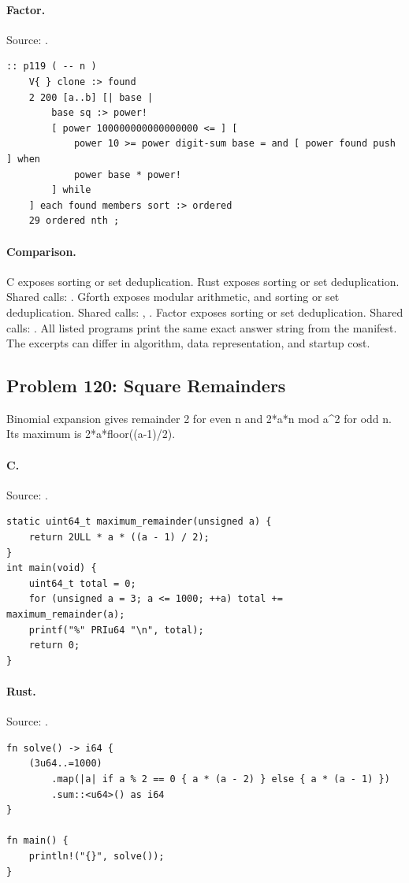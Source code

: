 \paragraph{Factor.} Source: .
\begin{lstlisting}
:: p119 ( -- n )
    V{ } clone :> found
    2 200 [a..b] [| base |
        base sq :> power!
        [ power 100000000000000000 <= ] [
            power 10 >= power digit-sum base = and [ power found push ] when
            power base * power!
        ] while
    ] each found members sort :> ordered
    29 ordered nth ;
\end{lstlisting}

\paragraph{Comparison.}
C exposes sorting or set deduplication. Rust exposes sorting or set deduplication. Shared calls: \texttt{}. Gforth exposes modular arithmetic, and sorting or set deduplication. Shared calls: \texttt{}, \texttt{}. Factor exposes sorting or set deduplication. Shared calls: \texttt{}.
All listed programs print the same exact answer string from the manifest. The excerpts can differ in algorithm, data representation, and startup cost.

\subsection{Problem 120: Square Remainders}
\label{walkthrough:p120}
Binomial expansion gives remainder 2 for even n and 2*a*n mod a\textasciicircum{}2 for odd n. Its maximum is 2*a*floor((a-1)/2).

\paragraph{C.} Source: .
\begin{lstlisting}
static uint64_t maximum_remainder(unsigned a) {
    return 2ULL * a * ((a - 1) / 2);
}
int main(void) {
    uint64_t total = 0;
    for (unsigned a = 3; a <= 1000; ++a) total += maximum_remainder(a);
    printf("%" PRIu64 "\n", total);
    return 0;
}
\end{lstlisting}

\paragraph{Rust.} Source: .
\begin{lstlisting}
fn solve() -> i64 {
    (3u64..=1000)
        .map(|a| if a % 2 == 0 { a * (a - 2) } else { a * (a - 1) })
        .sum::<u64>() as i64
}

fn main() {
    println!("{}", solve());
}
\end{lstlisting}

